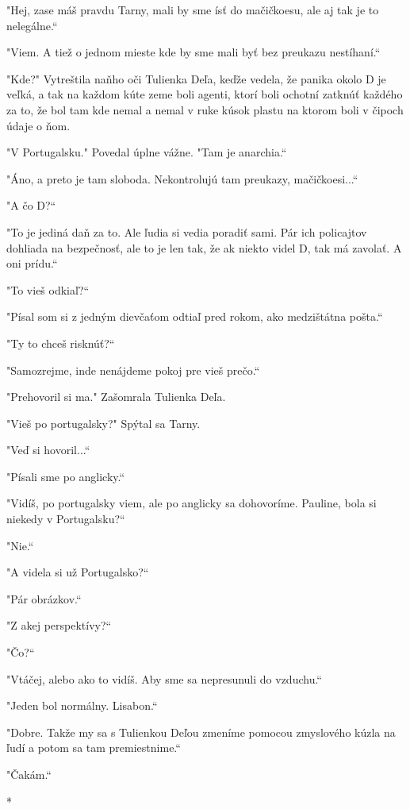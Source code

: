 \documentclass{book}
\begin{document}
"$ $Hej, zase máš pravdu Tarny, mali by sme ísť do mačičkoesu, ale aj tak je to nelegálne.“

"$ $Viem. A tiež o jednom mieste kde by sme mali byť bez preukazu nestíhaní.“

"$ $Kde?"$ $ Vytreštila naňho oči Tulienka Deľa, keďže vedela, že panika okolo D je veľká, a tak na každom kúte zeme boli agenti, ktorí boli ochotní zatknúť každého za to, že bol tam kde nemal a nemal v ruke kúsok plastu na ktorom boli v čipoch údaje o ňom.

"$ $V Portugalsku."$ $ Povedal úplne vážne. "$ $Tam je anarchia.“

"$ $Áno, a preto je tam sloboda. Nekontrolujú tam preukazy, mačičkoesi...“

"$ $A čo D?“

"$ $To je jediná daň za to. Ale ľudia si vedia poradiť sami. Pár ich policajtov dohliada na bezpečnosť, ale to je len tak, že ak niekto videl D, tak má zavolať. A oni prídu.“

"$ $To vieš odkiaľ?“

"$ $Písal som si z jedným dievčaťom odtiaľ pred rokom, ako medzištátna pošta.“

"$ $Ty to chceš risknúť?“

"$ $Samozrejme, inde nenájdeme pokoj pre vieš prečo.“

"$ $Prehovoril si ma."$ $ Zašomrala Tulienka Deľa.

"$ $Vieš po portugalsky?"$ $ Spýtal sa Tarny.

"$ $Veď si hovoril...“

"$ $Písali sme po anglicky.“

"$ $Vidíš, po portugalsky viem, ale po anglicky sa dohovoríme. Pauline, bola si niekedy v Portugalsku?“

"$ $Nie.“

"$ $A videla si už Portugalsko?“

"$ $Pár obrázkov.“

"$ $Z akej perspektívy?“

"$ $Čo?“

"$ $Vtáčej, alebo ako to vidíš. Aby sme sa nepresunuli do vzduchu.“

"$ $Jeden bol normálny. Lisabon.“

"$ $Dobre. Takže my sa s Tulienkou Deľou zmeníme pomocou zmyslového kúzla na ľudí a potom sa tam premiestnime.“

"$ $Čakám.“

\begin{center}

*

\end{center}
\end{document}

